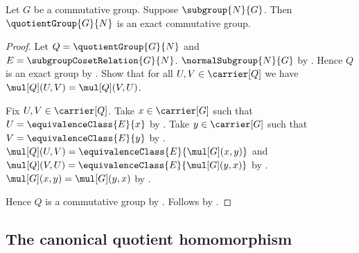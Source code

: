 \begin{theorem}\label{commutative_quotient_group_is_exact}
    Let $G$ be a commutative group.
    Suppose $\subgroup{N}{G}$.
    Then $\quotientGroup{G}{N}$ is an exact commutative group.
\end{theorem}
\begin{proof}
    Let $Q=\quotientGroup{G}{N}$ and
        $E=\subgroupCosetRelation{G}{N}$.
    $\normalSubgroup{N}{G}$ by
        .
    Hence $Q$ is an exact group by
        .
    Show that for all $U,V\in\carrier[Q]$ we have
        $\mul[Q](U,V)=\mul[Q](V,U)$.
    \begin{subproof}
        Fix $U,V\in\carrier[Q]$.
        Take $x\in\carrier[G]$ such that
            $U=\equivalenceClass{E}{x}$ by
            .
        Take $y\in\carrier[G]$ such that
            $V=\equivalenceClass{E}{y}$ by
            .
        $\mul[Q](U,V)=\equivalenceClass{E}{\mul[G](x,y)}$ and
            $\mul[Q](V,U)=\equivalenceClass{E}{\mul[G](y,x)}$ by
            .
        $\mul[G](x,y)=\mul[G](y,x)$ by
            .
    \end{subproof}
    Hence $Q$ is a commutative group by
        .
    Follows by \auto.
\end{proof}

\subsection{The canonical quotient homomorphism}

